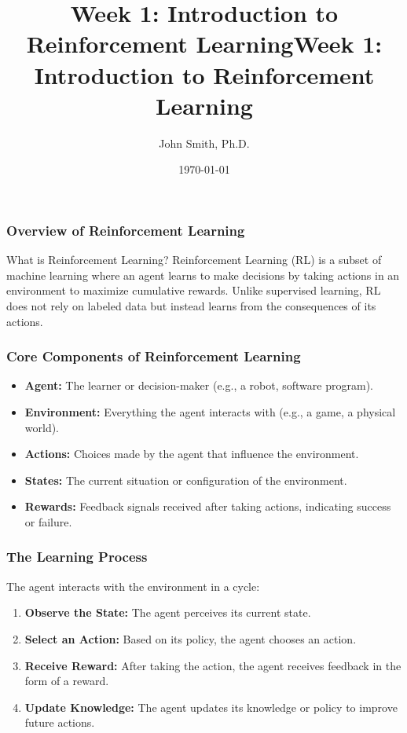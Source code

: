 \documentclass[aspectratio=169]{beamer}
\title[Reinforcement Learning]{Week 1: Introduction to Reinforcement Learning}
\author[J. Smith]{John Smith, Ph.D.}
\institute[University Name]{
  Department of Computer Science\\
  University Name\\
  Email: email@university.edu\\
  Website: www.university.edu
}
\date{\today}
\begin{document}
\frame{\titlepage}

\begin{frame}[fragile]
    \title{Week 1: Introduction to Reinforcement Learning}
    \maketitle
\end{frame}

\begin{frame}[fragile]
    \frametitle{Overview of Reinforcement Learning}

    \begin{block}{What is Reinforcement Learning?}
        Reinforcement Learning (RL) is a subset of machine learning where an agent learns to make decisions by taking actions in an environment to maximize cumulative rewards. Unlike supervised learning, RL does not rely on labeled data but instead learns from the consequences of its actions.
    \end{block}
\end{frame}

\begin{frame}[fragile]
    \frametitle{Core Components of Reinforcement Learning}

    \begin{itemize}
        \item \textbf{Agent:} The learner or decision-maker (e.g., a robot, software program).
        \item \textbf{Environment:} Everything the agent interacts with (e.g., a game, a physical world).
        \item \textbf{Actions:} Choices made by the agent that influence the environment.
        \item \textbf{States:} The current situation or configuration of the environment.
        \item \textbf{Rewards:} Feedback signals received after taking actions, indicating success or failure.
    \end{itemize}
\end{frame}

\begin{frame}[fragile]
    \frametitle{The Learning Process}

    The agent interacts with the environment in a cycle:
    \begin{enumerate}
        \item \textbf{Observe the State:} The agent perceives its current state.
        \item \textbf{Select an Action:} Based on its policy, the agent chooses an action.
        \item \textbf{Receive Reward:} After taking the action, the agent receives feedback in the form of a reward.
        \item \textbf{Update Knowledge:} The agent updates its knowledge or policy to improve future actions.
    \end{enumerate}
\end{frame}
\end{document}
